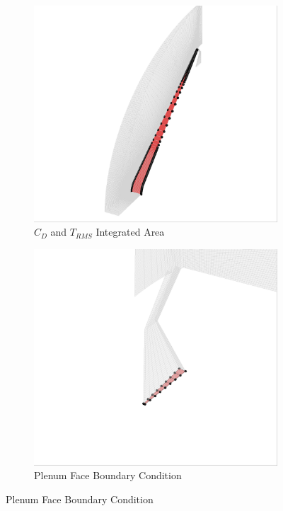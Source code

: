 \begin{figure}[h]
  \centering
	\begin{subfigure}[b]{0.4\textwidth}
    \centering
    \includegraphics[width=\textwidth]{figures/surface2.png}
    \caption{$C_D$ and $T_{RMS}$ Integrated Area}
    \label{fig:cd-t-rms-area}
  \end{subfigure}
	\begin{subfigure}[b]{0.4\textwidth}
    \centering
    \includegraphics[width=\textwidth]{figures/plenum_bc.png}
    \caption{Plenum Face Boundary Condition}
    \label{fig:plenum-face}
  \end{subfigure}
\end{figure}

